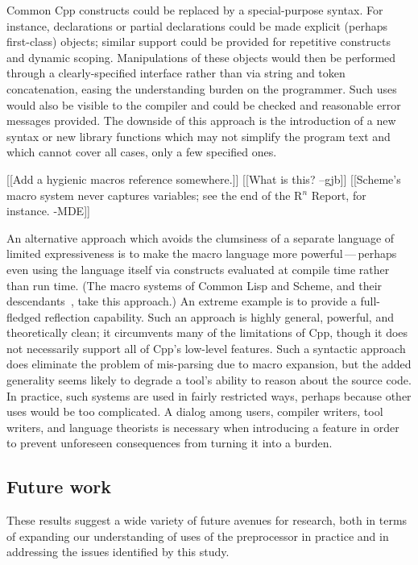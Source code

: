 \documentclass[10pt]{article}
\begin{document}
Common Cpp constructs could be replaced by a special-purpose syntax.  For
instance, declarations or partial declarations could be made explicit
(perhaps first-class) objects; similar support could be provided for
repetitive constructs and dynamic scoping.  Manipulations of these objects
would then be performed through a clearly-specified interface rather than
via string and token concatenation, easing the understanding burden on the
programmer.  Such uses would also be visible to the compiler and could be
checked and reasonable error messages provided.  The downside of this
approach is the introduction of a new syntax or new library functions which
may not simplify the program text and which cannot cover all cases, only a
few specified ones.

[[Add a hygienic macros reference somewhere.]]  
[[What is this? --gjb]]  [[Scheme's macro system never captures variables;
see the end of the R$^n$ Report, for instance.  -MDE]]

An alternative approach which avoids the clumsiness of a separate
language of limited expressiveness is to make the macro language more
powerful\,---\,perhaps even using the language itself via constructs
evaluated at compile time rather than run time.  (The macro systems of
Common Lisp and Scheme, and their descendants~\cite{WeiseC93}, take this
approach.)  An extreme example is to provide a full-fledged reflection
capability.  Such an approach is highly general, powerful, and
theoretically clean; it circumvents many of the limitations of Cpp,
though it does not necessarily support all of Cpp's low-level features.
Such a syntactic approach does eliminate the problem of mis-parsing due
to macro expansion, but the added generality seems likely to degrade a
tool's ability to reason about the source code.  In practice, such
systems are used in fairly restricted ways, perhaps because other uses
would be too complicated.  A dialog among users, compiler writers, tool
writers, and language theorists is necessary when introducing a feature
in order to prevent unforeseen consequences from turning it into a
burden.


\subsection{Future work}
 
These results suggest a wide variety of future avenues for research, both
in terms of expanding our understanding of uses of the preprocessor in
practice and in addressing the issues identified by this study.
\end{document}
